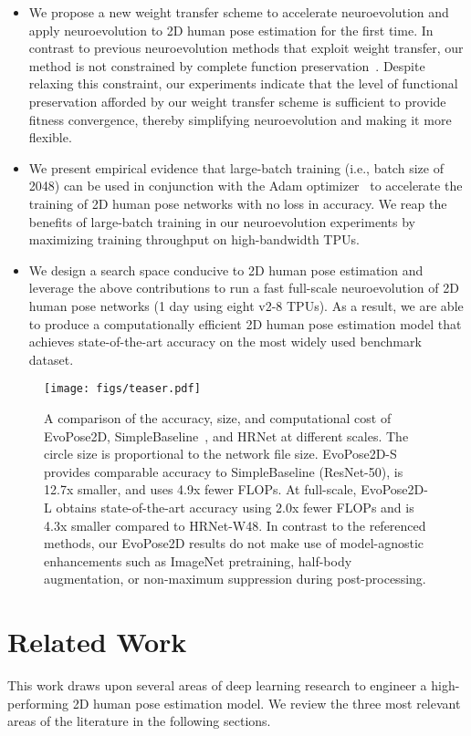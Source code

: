 \documentclass{ieeeaccess}
\begin{document}
\begin{itemize}
    \item We propose a new weight transfer scheme to accelerate neuroevolution and apply neuroevolution to 2D human pose estimation for the first time. In contrast to previous neuroevolution methods that exploit weight transfer, our method is not constrained by complete function preservation~\cite{wistuba2018deep, wei2016network}. Despite relaxing this constraint, our experiments indicate that the level of functional preservation afforded by our weight transfer scheme is sufficient to provide fitness convergence, thereby simplifying neuroevolution and making it more flexible.
    \item We present empirical evidence that large-batch training (i.e., batch size of 2048) can be used in conjunction with the Adam optimizer~\cite{kingma2014adam} to accelerate the training of 2D human pose networks with no loss in accuracy. We reap the benefits of large-batch training in our neuroevolution experiments by maximizing training throughput on high-bandwidth TPUs.
    \item We design a search space conducive to 2D human pose estimation and leverage the above contributions to run a fast full-scale neuroevolution of 2D human pose networks (1 day using eight v2-8 TPUs). As a result, we are able to produce a computationally efficient 2D human pose estimation model that achieves state-of-the-art accuracy on the most widely used benchmark dataset. 
\end{itemize}

\begin{figure}
\centering
    \texttt{[image: figs/teaser.pdf]}
\caption{A comparison of the accuracy, size, and computational cost of EvoPose2D, SimpleBaseline~\cite{xiao2018simple}, and HRNet\cite{sun2019deep} at different scales. The circle size is proportional to the network file size. EvoPose2D-S provides comparable accuracy to SimpleBaseline (ResNet-50), is 12.7x smaller, and uses 4.9x fewer FLOPs. At full-scale, EvoPose2D-L obtains state-of-the-art accuracy using 2.0x fewer FLOPs and is 4.3x smaller compared to HRNet-W48. In contrast to the referenced methods, our EvoPose2D results do not make use of model-agnostic enhancements such as ImageNet pretraining, half-body augmentation, or non-maximum suppression during post-processing.}
\label{fig:teaser}
\end{figure}

\section{Related Work}
This work draws upon several areas of deep learning research to engineer a high-performing 2D human pose estimation model. We review the three most relevant areas of the literature in the following sections.
\end{document}
